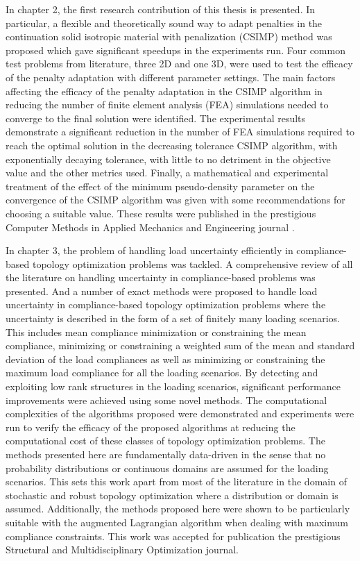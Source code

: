 In chapter 2, the first research contribution of this thesis is presented. In particular, a flexible and theoretically sound way to adapt penalties in the continuation solid isotropic material with penalization (CSIMP) method was proposed which gave significant speedups in the experiments run. Four common test problems from literature, three 2D and one 3D, were used to test the efficacy of the penalty adaptation with different parameter settings. The main factors affecting the efficacy of the penalty adaptation in the CSIMP algorithm in reducing the number of finite element analysis (FEA) simulations needed to converge to the final solution were identified. The experimental results demonstrate a significant reduction in the number of FEA simulations required to reach the optimal solution in the decreasing tolerance CSIMP algorithm, with exponentially decaying tolerance, with little to no detriment in the objective value and the other metrics used. Finally, a mathematical and experimental treatment of the effect of the minimum pseudo-density parameter on the convergence of the CSIMP algorithm was given with some recommendations for choosing a suitable value. These results were published in the prestigious Computer Methods in Applied Mechanics and Engineering journal \citep{TAREK2020112880}.

In chapter 3, the problem of handling load uncertainty efficiently in compliance-based topology optimization problems was tackled. A comprehensive review of all the literature on handling uncertainty in compliance-based problems was presented. And a number of exact methods were proposed to handle load uncertainty in compliance-based topology optimization problems where the uncertainty is described in the form of a set of finitely many loading scenarios. This includes mean compliance minimization or constraining the mean compliance, minimizing or constraining a weighted sum of the mean and standard deviation of the load compliances as well as minimizing or constraining the maximum load compliance for all the loading scenarios. By detecting and exploiting low rank structures in the loading scenarios, significant performance improvements were achieved using some novel methods. The computational complexities of the algorithms proposed were demonstrated and experiments were run to verify the efficacy of the proposed algorithms at reducing the computational cost of these classes of topology optimization problems. The methods presented here are fundamentally data-driven in the sense that no probability distributions or continuous domains are assumed for the loading scenarios. This sets this work apart from most of the literature in the domain of stochastic and robust topology optimization where a distribution or domain is assumed. Additionally, the methods proposed here were shown to be particularly suitable with the augmented Lagrangian algorithm when dealing with maximum compliance constraints. This work was accepted for publication the prestigious Structural and Multidisciplinary Optimization journal.

